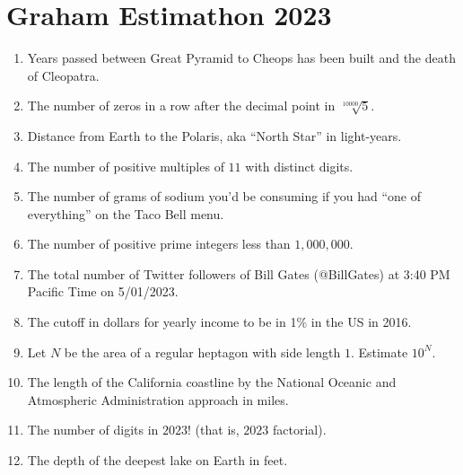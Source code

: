 \documentclass[12pt]{article}
\begin{document}
    \pagestyle{empty}
    \section*{Graham Estimathon 2023}
    \begin{enumerate}
        \item Years passed between Great Pyramid to Cheops has been built and the death of Cleopatra.
        \item The number of zeros in a row after the decimal point in $\sqrt[10000]{5}$.
        \item Distance from Earth to the Polaris, aka “North Star” in light-years.
        \item The number of positive multiples of $11$ with distinct digits.
        \item The number of grams of sodium you’d be consuming if you had “one of everything” on the Taco Bell menu.
        \item The number of positive prime integers less than $1{,}000{,}000$.
        \item The total number of Twitter followers of Bill Gates (@BillGates) at 3:40 PM Pacific Time on 5/01/2023.
        \item The cutoff in dollars for yearly income to be in 1\% in the US in 2016.
        \item Let $N$ be the area of a regular heptagon with side length $1$. Estimate $10^N$.
        \item The length of the California coastline by the National Oceanic and Atmospheric Administration approach in miles.
        \item The number of digits in $2023!$ (that is, $2023$ factorial).
        \item The depth of the deepest lake on Earth in feet.
    \end{enumerate}

    \newpage
\end{document}
